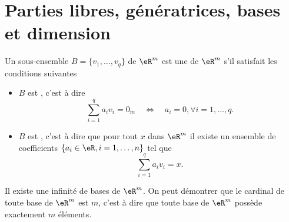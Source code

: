 
\section{Parties libres, génératrices, bases et dimension}
 
\begin{definition}
	Un sous-ensemble $B=\{v_1,\ldots,v_q\}$ de $\eR^m$ est une  de $\eR^m$ s'il satisfait les conditions suivantes
\begin{itemize}
	\item $B$ est , c'est à dire
\[
\sum_{i=1}^{q}a_i v_i=0_{m} \quad\Leftrightarrow\quad a_i=0, \forall i=1,\ldots,q.
\]
\item $B$ est , c'est à dire que pour tout $x$ dans $\eR^m$ il existe un ensemble de coefficients $\{a_i\in\eR, i=1,\ldots,n\}$ tel que
\[\sum_{i=1}^{q}a_i v_i=x.\]
\end{itemize}
\end{definition}
Il existe une infinité de bases de $\eR^m$. On peut démontrer que le cardinal de toute base de $\eR^m$ est $m$, c'est à dire que toute base de $\eR^m$ possède exactement $m$ éléments.

